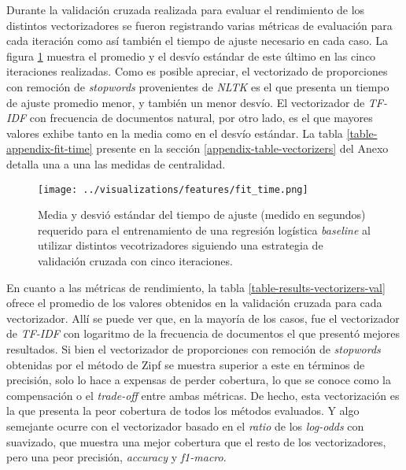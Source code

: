 Durante la validaci\'on cruzada realizada para evaluar el rendimiento de los
distintos vectorizadores se fueron registrando varias m\'etricas de evaluaci\'on
para cada iteraci\'on como as\'i tambi\'en el tiempo de ajuste necesario en cada caso.
La figura \ref{fig-results-features-fit-time} muestra el promedio y el desv\'io
est\'andar de este \'ultimo en las cinco iteraciones realizadas. Como es posible
apreciar, el vectorizado de proporciones con remoci\'on de \textit{stopwords}
provenientes de \textit{NLTK} es el que presenta un tiempo de ajuste promedio
menor, y tambi\'en un menor desv\'io. El vectorizador de \textit{TF-IDF} con
frecuencia de documentos natural, por otro lado, es el que mayores valores
exhibe tanto en la media como en el desv\'io est\'andar. La tabla \ref{table-appendix-fit-time}
presente en la secci\'on \ref{appendix-table-vectorizers} del Anexo detalla una
a una las medidas de centralidad.

\begin{figure}[h!]
    \centering
    \texttt{[image: ../visualizations/features/fit\_time.png]}
    \caption{Media y desvi\'o est\'andar del tiempo de ajuste (medido en segundos)
    requerido para el entrenamiento de una regresi\'on log\'istica \textit{baseline}
    al utilizar distintos vecotrizadores siguiendo una estrategia de
    validaci\'on cruzada con cinco iteraciones.}
    \label{fig-results-features-fit-time}
\end{figure}

En cuanto a las m\'etricas de rendimiento,
la tabla \ref{table-results-vectorizers-val} ofrece el promedio de los valores
obtenidos en la validaci\'on cruzada para cada vectorizador. All\'i se puede ver que,
en la mayor\'ia de los casos, fue el vectorizador de \textit{TF-IDF} con logaritmo
de la frecuencia de documentos el que present\'o mejores resultados. Si bien el
vectorizador de proporciones con remoci\'on de \textit{stopwords} obtenidas por el
m\'etodo de Zipf se muestra superior a este en t\'erminos de precisi\'on, solo
lo hace a expensas de perder cobertura, lo que se conoce como la compensaci\'on o el
\textit{trade-off} entre ambas m\'etricas. De hecho, esta vectorizaci\'on es la que
presenta la peor cobertura de todos los m\'etodos evaluados. Y algo semejante ocurre
con el vectorizador basado en el \textit{ratio} de los \textit{log-odds} con
suavizado, que
muestra una mejor cobertura que el resto de los vectorizadores, pero una peor
precisi\'on, \textit{accuracy} y \textit{f1-macro}.

